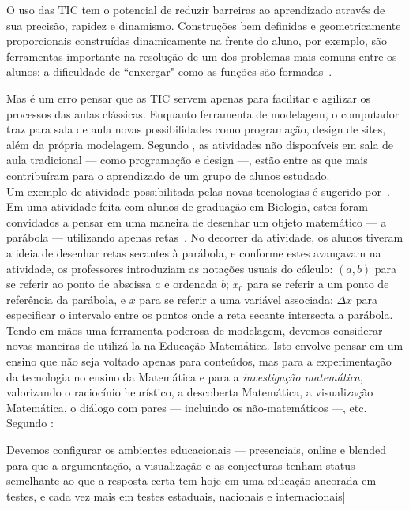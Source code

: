 O uso das TIC tem o potencial de reduzir barreiras ao aprendizado através de sua precisão, rapidez e dinamismo. Construções bem definidas e geometricamente proporcionais construídas dinamicamente na frente do aluno, por exemplo, são ferramentas importante na resolução de um dos problemas mais comuns entre os alunos: a dificuldade de ``enxergar" como as funções são formadas~\cite{rezende2012explorando}.

Mas é um erro pensar que as TIC servem apenas para facilitar e agilizar os processos das aulas clássicas. Enquanto ferramenta de modelagem, o computador traz para sala de aula novas possibilidades como programação, design de sites, além da própria modelagem. Segundo , as atividades não disponíveis em sala de aula tradicional --- como programação e design ---, estão entre as que mais contribuíram para o aprendizado de um grupo de alunos estudado. 
\\

Um exemplo de atividade possibilitada pelas novas tecnologias é sugerido por~\citeauthor{de2020fases}. Em uma atividade feita com alunos de graduação em Biologia, estes foram convidados a pensar em uma maneira de desenhar um objeto matemático --- a parábola --- utilizando apenas retas~\cite[capítulo 1]{de2020fases}. No decorrer da atividade, os alunos tiveram a ideia de desenhar retas secantes à parábola, e conforme estes avançavam na atividade, os professores introduziam as notações usuais do cálculo: $(a, b)$ para se referir ao ponto de abscissa $a$ e ordenada $b$; $x_0$ para se referir a um ponto de referência da parábola, e $x$ para se referir a uma variável associada; $\Delta x$ para especificar o intervalo entre os pontos onde a reta secante intersecta a parábola.
\\




Tendo em mãos uma ferramenta poderosa de modelagem, devemos considerar novas maneiras de utilizá-la na Educação Matemática. Isto envolve pensar em um ensino que não seja voltado apenas para conteúdos, mas para a experimentação da tecnologia no ensino da Matemática e para a \textit{investigação matemática}, valorizando o raciocínio heurístico, a descoberta Matemática, a visualização Matemática, o diálogo com pares --- incluindo os não-matemáticos ---, etc. Segundo :

\begin{citacao}
    Devemos configurar os ambientes educacionais — presenciais, online e blended para que a argumentação, a visualização e as conjecturas tenham status semelhante ao que a resposta certa tem hoje em uma educação ancorada em testes, e cada vez mais em testes estaduais, nacionais e internacionais] ~\cite[p.64]{de2020fases}
\end{citacao}

